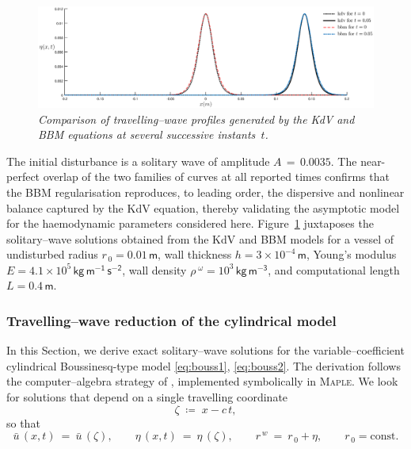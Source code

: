 \documentclass[alpha-refs, 12pt]{wiley-article}
\begin{document}
\begin{figure}
  \centering
  \includegraphics[width=\textwidth]{figs/KdVBBMSW.eps}
  \caption{\emph{Comparison of travelling–wave profiles generated by the KdV and BBM equations at several successive instants~$t$.}}
  \label{fig:2}
\end{figure}

The initial disturbance is a solitary wave of amplitude $A\,=\,0.0035$. The near-perfect overlap of the two families of curves at all reported times confirms that the BBM regularisation reproduces, to leading order, the dispersive and nonlinear balance captured by the KdV equation, thereby validating the asymptotic model for the haemodynamic parameters considered here. Figure~\ref{fig:2} juxtaposes the solitary–wave solutions obtained from the KdV and BBM models for a vessel of undisturbed radius $r_{\,0}=0.01\,\mathsf{m}$, wall thickness $h=3\times10^{-4}\,\mathsf{m}$, Young’s modulus $E=4.1\times10^{5}\,\mathsf{kg\,m^{-1}\,s^{-2}}$, wall density $\rho^{\;\omega}=10^{3}\,\mathsf{kg\,m^{-3}}$, and computational length $L=0.4\,\mathsf{m}$.

\subsubsection{Travelling–wave reduction of the cylindrical model}
\label{sec:cyl_travelling_wave}

In this Section, we derive exact solitary–wave solutions for the variable–coefficient cylindrical Boussinesq-type model \eqref{eq:bouss1}, \eqref{eq:bouss2}. The derivation follows the computer–algebra strategy of \cite{Dutykh2007}, implemented symbolically in \textsc{Maple}. We look for solutions that depend on a single travelling coordinate
\begin{equation*}
  \zeta \;\coloneqq\; x - c\,t,
\end{equation*}
so that
\begin{equation*}
  \bar{u}\,(x,t)\ =\ \bar{u}\,(\zeta), \qquad \eta\,(x,t)\ =\ \eta\,(\zeta), \qquad r^{\,w}\ =\ r_{\,0}+\eta, \qquad r_{\,0}=\text{const}.
\end{equation*}
\end{document}
